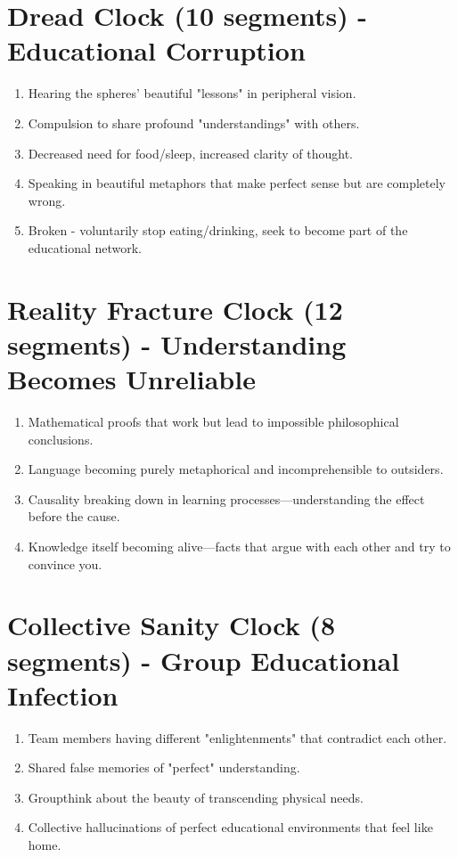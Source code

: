 \documentclass[11pt,twoside]{book}
\begin{document}
\section*{Dread Clock (10 segments) - Educational Corruption}

\begin{enumerate}
    \item Hearing the spheres' beautiful "lessons" in peripheral vision.
    \item Compulsion to share profound "understandings" with others.
    \item Decreased need for food/sleep, increased clarity of thought.
    \item Speaking in beautiful metaphors that make perfect sense but are completely wrong.
    \item Broken - voluntarily stop eating/drinking, seek to become part of the educational network.
\end{enumerate}

\section*{Reality Fracture Clock (12 segments) - Understanding Becomes Unreliable}

\begin{enumerate}
    \item Mathematical proofs that work but lead to impossible philosophical conclusions.
    \item Language becoming purely metaphorical and incomprehensible to outsiders.
    \item Causality breaking down in learning processes---understanding the effect before the cause.
    \item Knowledge itself becoming alive---facts that argue with each other and try to convince you.
\end{enumerate}

\section*{Collective Sanity Clock (8 segments) - Group Educational Infection}

\begin{enumerate}
    \item Team members having different "enlightenments" that contradict each other.
    \item Shared false memories of "perfect" understanding.
    \item Groupthink about the beauty of transcending physical needs.
    \item Collective hallucinations of perfect educational environments that feel like home.
\end{enumerate}
\end{document}
